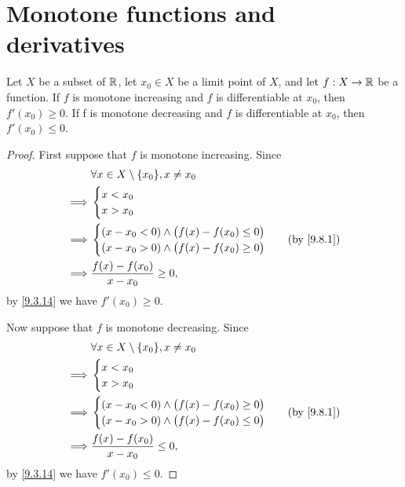 \section{Monotone functions and derivatives}\label{sec:10.3}

\begin{prop}\label{10.3.1}
  Let \(X\) be a subset of \(\mathbb{R}\), let \(x_0 \in X\) be a limit point of \(X\), and let \(f : X \to \mathbb{R}\) be a function.
  If \(f\) is monotone increasing and \(f\) is differentiable at \(x_0\), then \(f'(x_0) \geq 0\).
  If f is monotone decreasing and \(f\) is differentiable at \(x_0\), then \(f'(x_0) \leq 0\).
\end{prop}

\begin{proof}
  First suppose that \(f\) is monotone increasing.
  Since
  \begin{align*}
             & \forall x \in X \setminus \{x_0\}, x \neq x_0      \\
    \implies & \begin{cases}
                 x < x_0 \\
                 x > x_0 \\
               \end{cases}                                       \\
    \implies & \begin{cases}
                 (x - x_0 < 0) \land \big(f(x) - f(x_0) \leq 0\big) \\
                 (x - x_0 > 0) \land \big(f(x) - f(x_0) \geq 0\big) \\
               \end{cases} & \text{(by \cref{9.8.1})} \\
    \implies & \frac{f(x) - f(x_0)}{x - x_0} \geq 0,
  \end{align*}
  by \cref{9.3.14} we have \(f'(x_0) \geq 0\).

  Now suppose that \(f\) is monotone decreasing.
  Since
  \begin{align*}
             & \forall x \in X \setminus \{x_0\}, x \neq x_0      \\
    \implies & \begin{cases}
                 x < x_0 \\
                 x > x_0 \\
               \end{cases}                                       \\
    \implies & \begin{cases}
                 (x - x_0 < 0) \land \big(f(x) - f(x_0) \geq 0\big) \\
                 (x - x_0 > 0) \land \big(f(x) - f(x_0) \leq 0\big) \\
               \end{cases} & \text{(by \cref{9.8.1})} \\
    \implies & \frac{f(x) - f(x_0)}{x - x_0} \leq 0,
  \end{align*}
  by \cref{9.3.14} we have \(f'(x_0) \leq 0\).
\end{proof}

